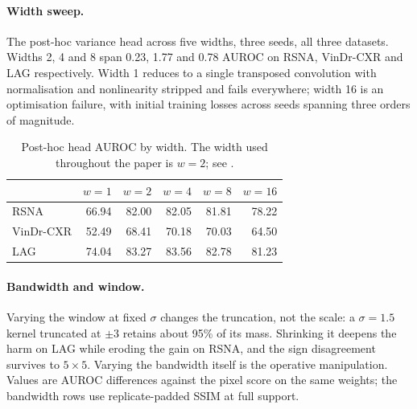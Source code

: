 \documentclass[pmlr,twocolumn,10pt]{jmlr} %
\begin{document}
\paragraph*{Width sweep.} The post-hoc variance head across five widths, three seeds, all
three datasets. Widths 2, 4 and 8 span 0.23, 1.77 and 0.78 AUROC on RSNA, VinDr-CXR and
LAG respectively. Width 1 reduces to a single transposed convolution with normalisation
and nonlinearity stripped and fails everywhere; width 16 is an optimisation failure, with
initial training losses across seeds spanning three orders of magnitude.

\begin{table}[h]
\centering\footnotesize
\caption{Post-hoc head AUROC by width. The width used throughout the paper is $w{=}2$;
see .}
\begin{tabular}{@{}lrrrrr@{}}
\toprule
 & $w{=}1$ & $w{=}2$ & $w{=}4$ & $w{=}8$ & $w{=}16$ \\
\midrule
RSNA      & 66.94 & 82.00 & 82.05 & 81.81 & 78.22 \\
VinDr-CXR & 52.49 & 68.41 & 70.18 & 70.03 & 64.50 \\
LAG       & 74.04 & 83.27 & 83.56 & 82.78 & 81.23 \\
\bottomrule
\end{tabular}
\end{table}

\paragraph*{Bandwidth and window.} Varying the window at fixed $\sigma$ changes the
truncation, not the scale: a $\sigma{=}1.5$ kernel truncated at $\pm3$ retains about 95\% of
its mass. Shrinking it deepens the harm on LAG while eroding the gain on RSNA, and the sign
disagreement survives to $5\times5$. Varying the bandwidth itself is the operative
manipulation. Values are AUROC differences against the pixel score on the same weights;
the bandwidth rows use replicate-padded SSIM at full support.
\end{document}
